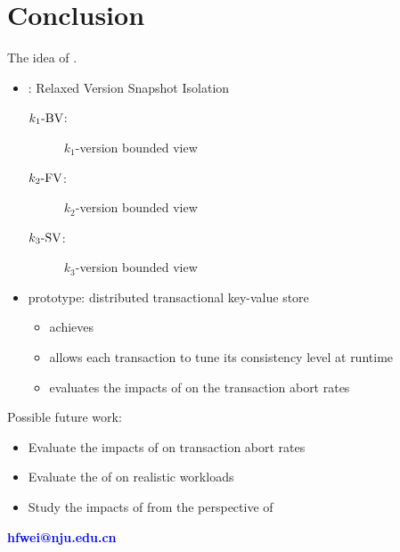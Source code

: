 \section{Conclusion}

\begin{frame}{}
  The idea of .

  \vspace{0.50cm}
  \begin{itemize}
    \setlength{\itemsep}{10pt}
    \item \rvsi{}: Relaxed Version Snapshot Isolation
      \begin{description}
	\item[$k_1\text{-BV}$:] $k_1$-version bounded \emph{} view
	\item[$k_2\text{-FV}$:] $k_2$-version bounded \emph{} view
	\item[$\kthreesv$:] $k_3$-version bounded \emph{} view
      \end{description}
    \item \chameleon{} prototype: distributed transactional key-value store
      \begin{itemize}
	\item achieves \rvsi{}
	\item allows each transaction to tune its consistency level at runtime
	\item evaluates the impacts of \rvsi{} on the transaction abort rates
      \end{itemize}
  \end{itemize}
\end{frame}

\begin{frame}{}
  Possible future work:
  \begin{itemize}
    \item Evaluate the impacts of \blue{$\kthreesv$} on transaction abort rates
    \item Evaluate the  of \chameleon{} on realistic workloads
    \item Study the impacts of \rvsi{} from the perspective of 
  \end{itemize}
\end{frame}

\begin{frame}[noframenumbering]
  \vspace{-0.8cm}
  \begin{center}
    \textcolor{blue}{\bf \large hfwei@nju.edu.cn}
  \end{center}
  \vspace{-0.5cm}
\end{frame}
